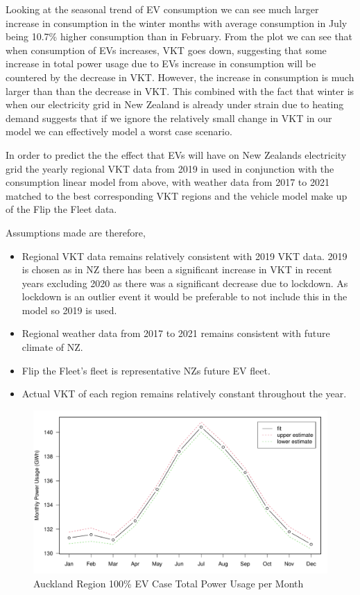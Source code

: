 \documentclass[
]{article}
\begin{document}
Looking at the seasonal trend of EV consumption we can see much larger
increase in consumption in the winter months with average consumption in
July being 10.7\% higher consumption than in February. From the plot we
can see that when consumption of EVs increases, VKT goes down,
suggesting that some increase in total power usage due to EVs increase
in consumption will be countered by the decrease in VKT. However, the
increase in consumption is much larger than than the decrease in VKT.
This combined with the fact that winter is when our electricity grid in
New Zealand is already under strain due to heating demand suggests that
if we ignore the relatively small change in VKT in our model we can
effectively model a worst case scenario.

In order to predict the the effect that EVs will have on New Zealands
electricity grid the yearly regional VKT data from 2019 in used in
conjunction with the consumption linear model from above, with weather
data from 2017 to 2021 matched to the best corresponding VKT regions and
the vehicle model make up of the Flip the Fleet data.

Assumptions made are therefore,

\begin{itemize}
\item Regional VKT data remains relatively consistent with 2019 VKT data. 2019 is chosen as in NZ there has been a significant increase in VKT in recent years excluding 2020 as there was a significant decrease due to lockdown. As lockdown is an outlier event it would be preferable to not include this in the model so 2019 is used.
\item Regional weather data from 2017 to 2021 remains consistent with future climate of NZ.
\item Flip the Fleet's fleet is representative NZs future EV fleet.
\item Actual VKT of each region remains relatively constant throughout the year.
\end{itemize}

\begin{figure}
\centering
\includegraphics{summary_week4_files/figure-latex/Auckland_power-1.pdf}
\caption{Auckland Region 100\% EV Case Total Power Usage per Month}
\end{figure}
\end{document}
